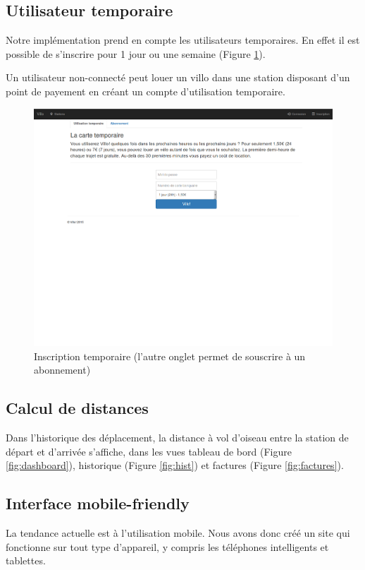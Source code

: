 \documentclass[a4paper,10pt]{article}
\begin{document}
\subsection{Utilisateur temporaire}
Notre implémentation prend en compte les utilisateurs temporaires.
En effet il est possible de s'inscrire pour 1 jour ou une semaine (Figure \ref{fig:inscr}).

Un utilisateur non-connecté peut louer un villo dans une station disposant d'un point
de payement en créant un compte d'utilisation temporaire.

\begin{figure}[H]
  \centering
  \includegraphics[scale=0.2]{inscription.png}
  \caption{\label{fig:inscr} Inscription temporaire (l'autre onglet permet de souscrire à un abonnement)}
\end{figure}


\subsection{Calcul de distances}
Dans l'historique des déplacement, la distance à vol d'oiseau entre la station
de départ et d'arrivée s'affiche, dans les vues tableau de bord (Figure \ref{fig:dashboard}),
historique (Figure \ref{fig:hist}) et factures (Figure \ref{fig:factures}).

\subsection{Interface mobile-friendly}
La tendance actuelle est à l'utilisation mobile. Nous avons donc créé un site qui
fonctionne sur tout type d'appareil, y compris les téléphones intelligents et tablettes. 
\end{document}

